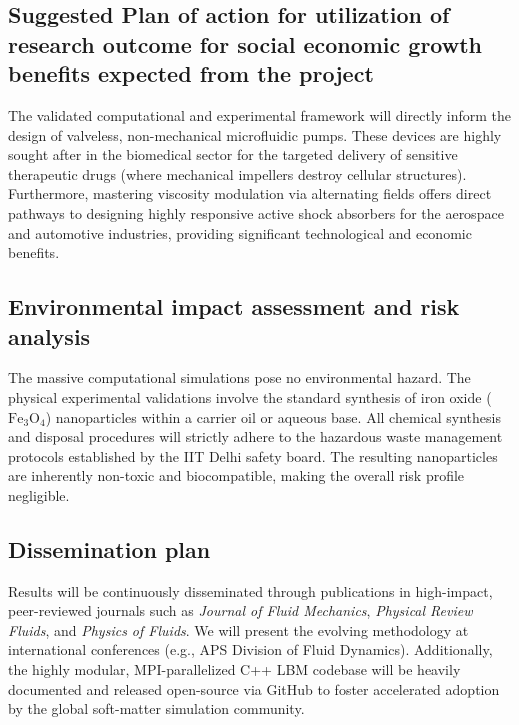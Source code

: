 \documentclass[11pt, a4paper]{article}
\begin{document}
\subsection{Suggested Plan of action for utilization of research outcome for social economic growth benefits expected from the project}
The validated computational and experimental framework will directly inform the design of valveless, non-mechanical microfluidic pumps. These devices are highly sought after in the biomedical sector for the targeted delivery of sensitive therapeutic drugs (where mechanical impellers destroy cellular structures). Furthermore, mastering viscosity modulation via alternating fields offers direct pathways to designing highly responsive active shock absorbers for the aerospace and automotive industries, providing significant technological and economic benefits.

\subsection{Environmental impact assessment and risk analysis}
The massive computational simulations pose no environmental hazard. The physical experimental validations involve the standard synthesis of iron oxide ($\mathrm{Fe_3O_4}$) nanoparticles within a carrier oil or aqueous base. All chemical synthesis and disposal procedures will strictly adhere to the hazardous waste management protocols established by the IIT Delhi safety board. The resulting nanoparticles are inherently non-toxic and biocompatible, making the overall risk profile negligible.

\subsection{Dissemination plan}
Results will be continuously disseminated through publications in high-impact, peer-reviewed journals such as \textit{Journal of Fluid Mechanics}, \textit{Physical Review Fluids}, and \textit{Physics of Fluids}. We will present the evolving methodology at international conferences (e.g., APS Division of Fluid Dynamics). Additionally, the highly modular, MPI-parallelized C++ LBM codebase will be heavily documented and released open-source via GitHub to foster accelerated adoption by the global soft-matter simulation community.
\end{document}
